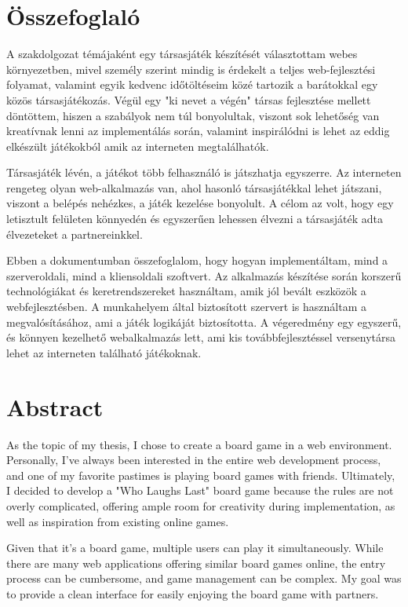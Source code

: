 \documentclass[a4paper,twoside]{article}
\begin{document}
\newpage
\section{Összefoglaló}
A szakdolgozat témájaként egy társasjáték készítését választottam webes környezetben, mivel személy szerint mindig is érdekelt a teljes web-fejlesztési folyamat, valamint egyik kedvenc időtöltéseim közé tartozik a barátokkal egy közös társasjátékozás. 
Végül egy "ki nevet a végén" társas fejlesztése mellett döntöttem, hiszen a szabályok nem túl bonyolultak, viszont sok lehetőség van kreatívnak lenni az implementálás során, valamint inspirálódni is lehet az eddig elkészült játékokból amik az interneten megtalálhatók.

Társasjáték lévén, a játékot több felhasználó is játszhatja egyszerre.  Az interneten rengeteg olyan web-alkalmazás van, ahol hasonló társasjátékkal
lehet játszani, viszont a belépés nehézkes, a játék kezelése bonyolult. A célom az volt, hogy
egy letisztult felületen könnyedén és egyszerűen lehessen élvezni a társasjáték adta
élvezeteket a partnereinkkel.

Ebben a dokumentumban összefoglalom, hogy hogyan implementáltam, mind a szerveroldali,
mind a kliensoldali szoftvert. Az alkalmazás készítése során korszerű technológiákat és
keretrendszereket használtam, amik jól bevált eszközök a webfejlesztésben. A munkahelyem
által biztosított szervert is használtam a megvalósításához, ami a játék logikáját biztosította. A
végeredmény egy egyszerű, és könnyen kezelhető webalkalmazás lett, ami kis
továbbfejlesztéssel versenytársa lehet az interneten található játékoknak.


\newpage
\section{Abstract}
As the topic of my thesis, I chose to create a board game in a web environment. Personally, I've always been interested in the entire web development process, and one of my favorite pastimes is playing board games with friends. Ultimately, I decided to develop a "Who Laughs Last" board game because the rules are not overly complicated, offering ample room for creativity during implementation, as well as inspiration from existing online games.

Given that it's a board game, multiple users can play it simultaneously. While there are many web applications offering similar board games online, the entry process can be cumbersome, and game management can be complex. My goal was to provide a clean interface for easily enjoying the board game with partners.
\end{document}

